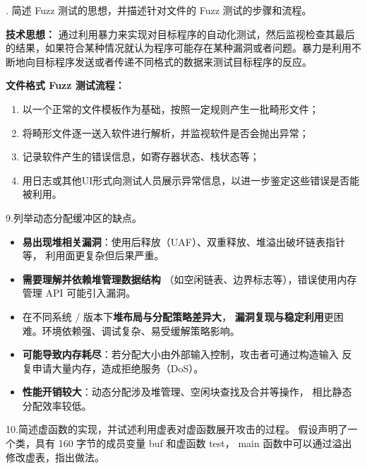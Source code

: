 \documentclass[UTF8]{ctexart}
\begin{document}
. 简述 Fuzz 测试的思想，并描述针对文件的 Fuzz 测试的步骤和流程。

\begin{tcolorbox}[title=答题区, height=6.5cm]
\end{tcolorbox}

\textbf{技术思想：}  
通过利用暴力来实现对目标程序的自动化测试，然后监视检查其最后的结果，如果符合某种情况就认为程序可能存在某种漏洞或者问题。暴力是利用不断地向目标程序发送或者传递不同格式的数据来测试目标程序的反应。

\textbf{文件格式 Fuzz 测试流程：}
\begin{enumerate}
  \item 以一个正常的文件模板作为基础，按照一定规则产生一批畸形文件；
  \item 将畸形文件逐一送入软件进行解析，并监视软件是否会抛出异常；
  \item 记录软件产生的错误信息，如寄存器状态、栈状态等；
  \item 用日志或其他UI形式向测试人员展示异常信息，以进一步鉴定这些错误是否能被利用。
\end{enumerate}


\noindent
9.列举动态分配缓冲区的缺点。

\begin{tcolorbox}[title=答题区, height=6.5cm]
\end{tcolorbox}


\noindent
\begin{itemize}
  \item [(1)]\textbf{易出现堆相关漏洞}：使用后释放（UAF）、双重释放、堆溢出破坏链表指针等，
        利用面更复杂但后果严重。
  \item [(2)]\textbf{需要理解并依赖堆管理数据结构}
        （如空闲链表、边界标志等），错误使用内存管理 API 可能引入漏洞。
  \item [(3)]在不同系统 / 版本下\textbf{堆布局与分配策略差异大}，
        \textbf{漏洞复现与稳定利用}更困难。环境依赖强、调试复杂、易受缓解策略影响。
  \item [(4)]\textbf{可能导致内存耗尽}：若分配大小由外部输入控制，攻击者可通过构造输入
        反复申请大量内存，造成拒绝服务（DoS）。
  \item [(5)]\textbf{性能开销较大}：动态分配涉及堆管理、空闲块查找及合并等操作，
        相比静态分配效率较低。
\end{itemize}


\noindent
10.简述虚函数的实现，并试述利用虚表对虚函数展开攻击的过程。
假设声明了一个类，具有 160 字节的成员变量 buf 和虚函数 test，
main 函数中可以通过溢出修改虚表，指出做法。
\end{document}
